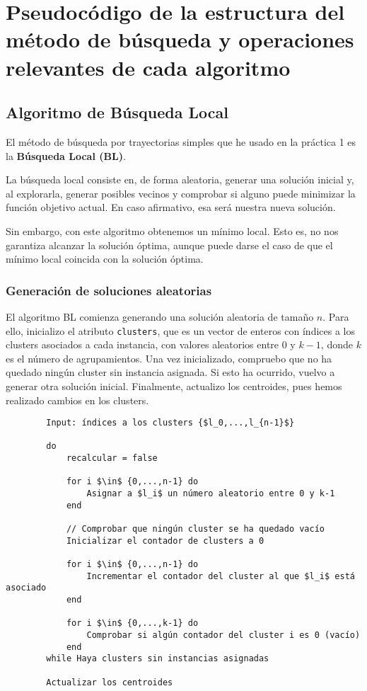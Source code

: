 \newpage

\section{Pseudocódigo de la estructura del método de búsqueda y operaciones relevantes de cada algoritmo}
	\subsection{Algoritmo de Búsqueda Local}

	El método de búsqueda por trayectorias simples que he usado en la práctica 1 es la \textbf{Búsqueda Local (BL)}.
	
	La búsqueda local consiste en, de forma aleatoria, generar una solución inicial y, al explorarla, generar posibles 
	vecinos y comprobar si alguno puede minimizar la función objetivo actual. En caso afirmativo, esa será nuestra nueva
	solución.

	Sin embargo, con este algoritmo obtenemos un mínimo local. Esto es, no nos garantiza alcanzar la solución óptima, aunque 
	puede darse el caso de que el mínimo local coincida con la solución óptima.

	\subsubsection{Generación de soluciones aleatorias}
		El algoritmo BL comienza generando una solución aleatoria de tamaño $n$. Para ello, inicializo el atributo \lstinline!clusters!, que 
		es un vector de enteros con índices a los clusters asociados a cada instancia, con valores aleatorios entre $0$ y $k-1$, 
		donde $k$ es el número de agrupamientos. Una vez inicializado, compruebo que no ha quedado ningún cluster sin instancia asignada.
		Si esto ha ocurrido, vuelvo a generar otra solución inicial. Finalmente, actualizo los centroides, pues hemos realizado cambios en los clusters.

		\footnotesize
		\begin{lstlisting}
		Input: índices a los clusters {$l_0,...,l_{n-1}$}

		do 
			recalcular = false
			
			for i $\in$ {0,...,n-1} do 
				Asignar a $l_i$ un número aleatorio entre 0 y k-1
			end
			
			// Comprobar que ningún cluster se ha quedado vacío
			Inicializar el contador de clusters a 0
			
			for i $\in$ {0,...,n-1} do 
				Incrementar el contador del cluster al que $l_i$ está asociado
			end
			
			for i $\in$ {0,...,k-1} do
				Comprobar si algún contador del cluster i es 0 (vacío)
			end
		while Haya clusters sin instancias asignadas
		
		Actualizar los centroides
		\end{lstlisting}
		\normalsize

